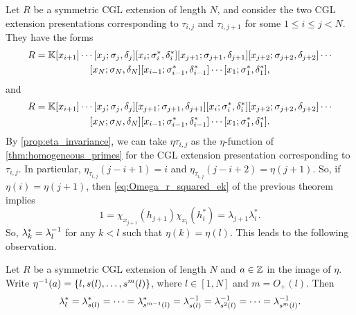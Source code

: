 Let $R$ be a symmetric CGL extension of length $N$, and consider the two CGL extension
presentations corresponding to $\tau_{i,j}$ and $\tau_{i, j+1}$ for some $1 \leq i \leq
	j < N$. They have the forms
\begin{multline}
	R = \mathbb{K}[x_{i+1}]\cdots[x_j;\sigma_j,\delta_j][x_i;\sigma^*_i,\delta^*_i][x_{j+1}; \sigma_{j+1}, \delta_{j+1}][x_{j+2}; \sigma_{j+2}, \delta_{j+2}]\cdots \\
	[x_N;\sigma_{N}, \delta_{N}][x_{i-1}; \sigma_{i-1}^*, \delta^*_{i-1}]\cdots[x_1; \sigma_1^*, \delta^*_1],
\end{multline}
and
\begin{multline}
	R = \mathbb{K}[x_{i+1}]\cdots[x_j;\sigma_j,\delta_j][x_{j+1}; \sigma_{j+1}, \delta_{j+1}][x_i;\sigma^*_i,\delta^*_i][x_{j+2}; \sigma_{j+2}, \delta_{j+2}]\cdots \\
	[x_N;\sigma_{N}, \delta_{N}][x_{i-1}; \sigma_{i-1}^*, \delta^*_{i-1}]\cdots[x_1; \sigma_1^*, \delta^*_1].
\end{multline}
%
By \cref{prop:eta_invariance}, we can take $\eta\tau_{i,j}$ as the $\eta$-function of
\cref{thm:homogeneous_primes} for the CGL extension presentation corresponding to
$\tau_{i,j}$. In particular, $\eta_{\tau_{i,j}}(j-i+1) = i$ and
$\eta_{\tau_{i,j}}(j-i+2) = \eta(j+1)$. So, if $\eta(i) = \eta(j+1)$, then
\cref{eq:Omega_r_squared_ek} of the previous theorem implies
\begin{equation*}
	1 = \chi_{x_{j+1}}(h_{j+1})\chi_{x_i}(h^*_i) = \lambda_{j+1}\lambda_i^*.
\end{equation*}
%
So, $\lambda_{k}^* = \lambda_{l}^{-1}$ for any $k < l$ such that $\eta(k) = \eta(l)$.
This leads to the following observation.
\begin{proposition}\label{prop:lambda*_of_successor}
	Let $R$ be a symmetric CGL extension of length $N$ and $a \in \mathbb{Z}$ in the image of $\eta$. Write $\eta^{-1}(a) = \{l, s(l), \dots, s^m(l)\}$, where $l\in [1, N]$ and $m = O_{+}(l)$. Then
	\begin{equation*}
		\lambda_l^* = \lambda_{s(l)}^* = \cdots = \lambda_{s^{m-1}(l)}^* = \lambda^{-1}_{s(l)}=\lambda^{-1}_{s^2(l)} = \cdots = \lambda^{-1}_{s^m(l)}.
	\end{equation*}
\end{proposition}

